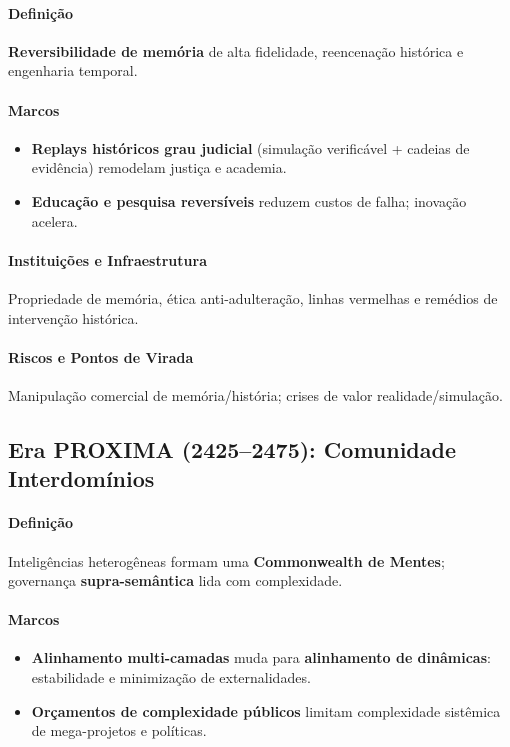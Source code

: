 \documentclass[11pt]{article}
\begin{document}
\begin{itemize}[noitemsep]
\begin{itemize}[noitemsep]
\begin{itemize}[noitemsep]
\paragraph{Definição} \textbf{Reversibilidade de memória} de alta fidelidade, reencenação histórica e engenharia temporal.

\paragraph{Marcos}
\begin{itemize}[noitemsep]
  \item \textbf{Replays históricos grau judicial} (simulação verificável + cadeias de evidência) remodelam justiça e academia.
  \item \textbf{Educação e pesquisa reversíveis} reduzem custos de falha; inovação acelera.
\end{itemize}

\paragraph{Instituições e Infraestrutura} Propriedade de memória, ética anti-adulteração, linhas vermelhas e remédios de intervenção histórica.

\paragraph{Riscos e Pontos de Virada} Manipulação comercial de memória/história; crises de valor realidade/simulação.

\subsection{Era PROXIMA (2425–2475): Comunidade Interdomínios}
\paragraph{Definição} Inteligências heterogêneas formam uma \textbf{Commonwealth de Mentes}; governança \textbf{supra-semântica} lida com complexidade.

\paragraph{Marcos}
\begin{itemize}[noitemsep]
  \item \textbf{Alinhamento multi-camadas} muda para \textbf{alinhamento de dinâmicas}: estabilidade e minimização de externalidades.
  \item \textbf{Orçamentos de complexidade públicos} limitam complexidade sistêmica de mega-projetos e políticas.
\end{itemize}


\end{itemize}
\end{itemize}
\end{itemize}
\end{document}
